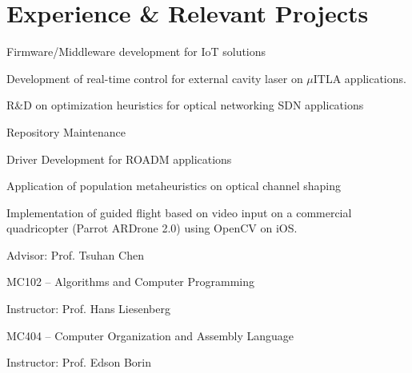 \documentclass[]{deedy-resume-openfont}
\begin{document}
\begin{minipage}[t]{0.66\textwidth} 


\section{Experience \& Relevant Projects}
\vspace{\topsep} %
\begin{tightemize}
	\item Firmware/Middleware development for IoT solutions
	\item Development of real-time control for external cavity laser on $\mu$ITLA applications.
	\item R\&D on optimization heuristics for optical networking SDN applications \cite{assine2016sdn, cognitive_cpqd}
	\item Repository Maintenance
	
	
\end{tightemize}
\sectionsep

\begin{tightemize}
	\item Driver Development for ROADM applications
	\item Application of population metaheuristics on optical channel shaping \cite{de2015embedded}
\end{tightemize}
\sectionsep

\begin{tightemize}
	\item Implementation of guided flight based on video input on a commercial quadricopter (Parrot ARDrone 2.0) using OpenCV on iOS. 
	\item Advisor: Prof. Tsuhan Chen
\end{tightemize}
\sectionsep


\begin{tightemize}
	\item MC102 – Algorithms and Computer Programming
	\item Instructor: Prof. Hans Liesenberg
\end{tightemize}
\begin{tightemize}
	\item MC404 – Computer Organization and	Assembly Language
	\item Instructor: Prof. Edson Borin 
\end{tightemize}
\sectionsep





\end{minipage}
\end{document}
